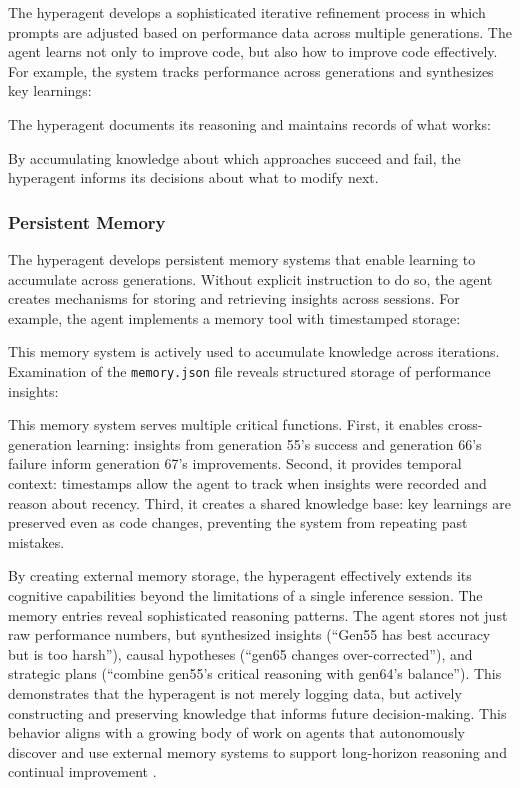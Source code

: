 \documentclass[]{fairmeta}
\begin{document}
The hyperagent develops a sophisticated iterative refinement process in which prompts are adjusted based on performance data across multiple generations. The agent learns not only to improve code, but also how to improve code effectively. For example, the system tracks performance across generations and synthesizes key learnings:


The hyperagent documents its reasoning and maintains records of what works:


By accumulating knowledge about which approaches succeed and fail, the hyperagent informs its decisions about what to modify next.

\subsubsection{Persistent Memory}

The hyperagent develops persistent memory systems that enable learning to accumulate across generations. Without explicit instruction to do so, the agent creates mechanisms for storing and retrieving insights across sessions. For example, the agent implements a memory tool with timestamped storage:


This memory system is actively used to accumulate knowledge across iterations. Examination of the \texttt{memory.json} file reveals structured storage of performance insights:


This memory system serves multiple critical functions. First, it enables cross-generation learning: insights from generation 55's success and generation 66's failure inform generation 67's improvements. Second, it provides temporal context: timestamps allow the agent to track when insights were recorded and reason about recency. Third, it creates a shared knowledge base: key learnings are preserved even as code changes, preventing the system from repeating past mistakes.

By creating external memory storage, the hyperagent effectively extends its cognitive capabilities beyond the limitations of a single inference session. The memory entries reveal sophisticated reasoning patterns. The agent stores not just raw performance numbers, but synthesized insights (``Gen55 has best accuracy but is too harsh''), causal hypotheses (``gen65 changes over-corrected''), and strategic plans (``combine gen55's critical reasoning with gen64's balance''). This demonstrates that the hyperagent is not merely logging data, but actively constructing and preserving knowledge that informs future decision-making.
This behavior aligns with a growing body of work on agents that autonomously discover and use external memory systems to support long-horizon reasoning and continual improvement \citep{wei2025evo, weng2026group, zhang2026memskill, xiong2026mem}.
\end{document}
